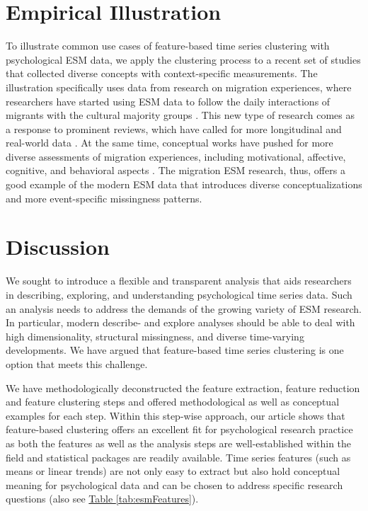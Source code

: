 \documentclass[man, 12pt, a4paper, mask, floatsintext]{apa7}
\theoremstyle{break}
\theoremstyle{plain}
\newcommand{\tblref}[2][]{\hyperref[#2]{Table \ref*{#2}#1}}
\begin{document}
\section{Empirical Illustration}
To illustrate common use cases of feature-based time series clustering with psychological ESM data, we apply the clustering process to a recent set of studies that collected diverse concepts with context-specific measurements. The illustration specifically uses data from research on migration experiences, where researchers have started using ESM data to follow the daily interactions of migrants with the cultural majority groups \citep[e.g.,][]{Keil2020}. This new type of research comes as a response to prominent reviews, which have called for more longitudinal \citep[e.g.,][]{Ward2019} and real-world data \citep[e.g.,][]{McKeown2017}. At the same time, conceptual works have pushed for more diverse assessments of migration experiences, including motivational, affective, cognitive, and behavioral aspects \citep[e.g.,][]{Kreienkamp2022d}. The migration ESM research, thus, offers a good example of the modern ESM data that introduces diverse conceptualizations and more event-specific missingness patterns.


%


\section{Discussion}
We sought to introduce a flexible and transparent analysis that aids researchers in describing, exploring, and understanding psychological time series data. Such an analysis needs to address the demands of the growing variety of ESM research. In particular, modern describe- and explore analyses should be able to deal with high dimensionality, structural missingness, and diverse time-varying developments. We have argued that feature-based time series clustering is one option that meets this challenge. 

We have methodologically deconstructed the feature extraction, feature reduction and feature clustering steps and offered methodological as well as conceptual examples for each step. Within this step-wise approach, our article shows that feature-based clustering offers an excellent fit for psychological research practice as both the features as well as the analysis steps are well-established within the field and statistical packages are readily available. Time series features (such as means or linear trends) are not only easy to extract but also hold conceptual meaning for psychological data and can be chosen to address specific research questions (also see \tblref{tab:esmFeatures}). 
\end{document}
